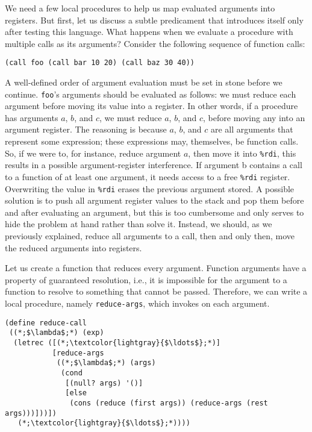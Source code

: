 We need a few local procedures to help us map evaluated arguments into registers. But first, let us discuss a subtle predicament that introduces itself only after testing this language. What happens when we evaluate a procedure with multiple calls as its arguments? Consider the following sequence of function calls:

\begin{cl}[]{}\begin{lstlisting}[language=MyScheme]
(call foo (call bar 10 20) (call baz 30 40))
\end{lstlisting}\end{cl}

A well-defined order of argument evaluation must be set in stone before we continue. \texttt{foo}'s arguments should be evaluated as follows: we must reduce each argument before moving its value into a register. In other words, if a procedure has arguments $a$, $b$, and $c$, we must reduce $a$, $b$, and $c$, before moving any into an argument register. The reasoning is because $a$, $b$, and $c$ are all arguments that represent some expression; these expressions may, themselves, be function calls. So, if we were to, for instance, reduce argument $a$, then move it into \texttt{\%rdi}, this results in a possible argument-register interference. If argument b contains a call to a function of at least one argument, it needs access to a free \texttt{\%rdi} register. Overwriting the value in \texttt{\%rdi} erases the previous argument stored. A possible solution is to push all argument register values to the stack and pop them before and after evaluating an argument, but this is too cumbersome and only serves to hide the problem at hand rather than solve it. Instead, we should, as we previously explained, reduce all arguments to a call, then and only then, move the reduced arguments into registers. 

Let us create a function that reduces every argument. Function arguments have a property of guaranteed resolution, i.e., it is impossible for the argument to a function to resolve to something that cannot be passed. Therefore, we can write a local procedure, namely \texttt{reduce-args}, which invokes  on each argument.

\begin{cl}[]{}\begin{lstlisting}[language=MyScheme]
(define reduce-call
 ((*;$\lambda$;*) (exp)
  (letrec ([(*;\textcolor{lightgray}{$\ldots$};*)]
           [reduce-args 
            ((*;$\lambda$;*) (args)
             (cond
              [(null? args) '()]
              [else 
               (cons (reduce (first args)) (reduce-args (rest args)))]))])
   (*;\textcolor{lightgray}{$\ldots$};*))))
\end{lstlisting}\end{cl}


